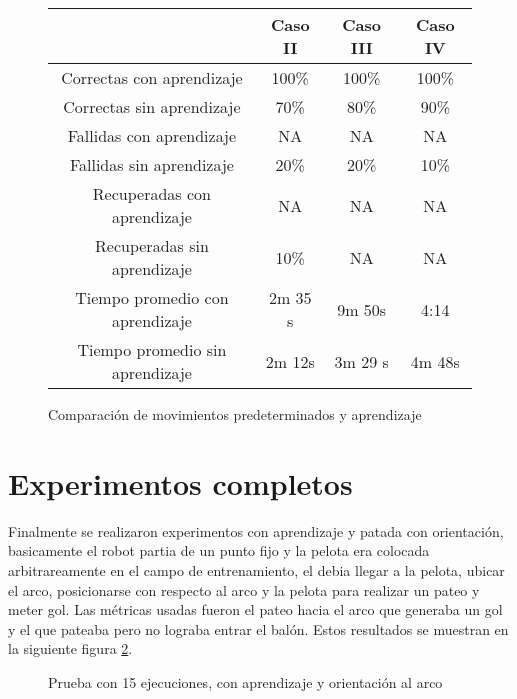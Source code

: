 \begin{figure}
\centering
\begin{tabular}{|c|c|c|c|}
\hline  & Caso II & Caso III & Caso IV \\ 
\hline 
Correctas con aprendizaje & 100\% & 100\% & 100\% \\ 
\hline 
Correctas sin aprendizaje & 70\% & 80\% & 90\% \\ 
\hline 
Fallidas con aprendizaje & NA & NA & NA \\ 
\hline 
Fallidas sin aprendizaje & 20\% & 20\% & 10\% \\ 
\hline 
Recuperadas con aprendizaje & NA & NA & NA \\ 
\hline 
Recuperadas sin aprendizaje & 10\% & NA & NA \\ 
\hline 
Tiempo promedio con aprendizaje & 2m 35 s & 9m 50s & 4:14 \\ 
\hline 
Tiempo promedio sin aprendizaje & 2m 12s & 3m 29 s & 4m 48s \\
\hline
\end{tabular} 
\caption{Comparaci\'on de movimientos predeterminados y aprendizaje}
\label{tabla:comparacion}

\end{figure}

\section{Experimentos completos}

Finalmente se realizaron experimentos con aprendizaje y patada con orientaci\'on, basicamente el robot partia de un punto fijo y la pelota era colocada arbitrareamente en el campo de entrenamiento, el debia llegar a la pelota, ubicar el arco, posicionarse con respecto al arco y la pelota para realizar un pateo y meter gol.
Las m\'etricas usadas fueron el pateo hacia el arco que generaba un gol y el que pateaba pero no lograba entrar el bal\'on. Estos resultados se muestran en la siguiente figura \ref{fig:orientacion}.


\begin{figure}[h]
\centering
{}
\caption{Prueba con 15 ejecuciones, con aprendizaje y orientaci\'on al arco }
\label{fig:orientacion}
\end{figure} 

